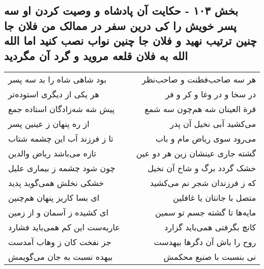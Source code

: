 \begin{center}
\section*{بخش ۱۰۳ - حکایت آن پادشاه و وصیت کردن او سه پسر خویش را کی درین سفر در ممالک من فلان جا چنین ترتیب نهید و فلان جا چنین نواب نصب کنید اما الله الله به فلان قلعه  مروید و گرد آن مگردید}
\label{sec:sh103}
\begin{longtable}{l p{0.5cm} r}
بود شاهی شاه را بد سه پسر
&&
هر سه صاحب‌فطنت و صاحب‌نظر
\\
هر یکی از دیگری استوده‌تر
&&
در سخا و در وغا و کر و فر
\\
پیش شه شه‌زادگان استاده جمع
&&
قرة العینان شه هم‌چون سه شمع
\\
از ره پنهان ز عینین پسر
&&
می‌کشید آبی نخیل آن پدر
\\
تا ز فرزند آب این چشمه شتاب
&&
می‌رود سوی ریاض مام و باب
\\
تازه می‌باشد ریاض والدین
&&
گشته جاری عینشان زین هر دو عین
\\
چون شود چشمه ز بیماری علیل
&&
خشک گردد برگ و شاخ آن نخیل
\\
خشکی نخلش همی‌گوید پدید
&&
که ز فرزندان شجر نم می‌کشید
\\
ای بسا کاریز پنهان هم‌چنین
&&
متصل با جانتان یا غافلین
\\
ای کشیده ز آسمان و از زمین
&&
مایه‌ها تا گشته جسم تو سمین
\\
عاریه‌ست این کم همی‌باید فشارد
&&
کانچ بگرفتی همی‌باید گزارد
\\
جز نفخت کان ز وهاب آمدست
&&
روح را باش آن دگرها بیهدست
\\
بیهده نسبت به جان می‌گویمش
&&
نی بنسبت با صنیع محکمش
\\
\end{longtable}
\end{center}
